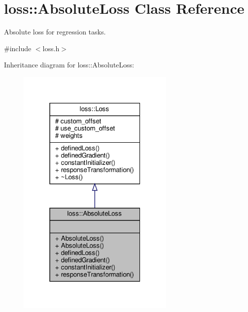 \hypertarget{classloss_1_1_absolute_loss}{}\section{loss\+:\+:Absolute\+Loss Class Reference}
\label{classloss_1_1_absolute_loss}


Absolute loss for regression tasks.  




{\ttfamily \#include $<$loss.\+h$>$}



Inheritance diagram for loss\+:\+:Absolute\+Loss\+:
\nopagebreak
\begin{figure}[H]
\begin{center}
\leavevmode
\includegraphics[width=217pt]{classloss_1_1_absolute_loss__inherit__graph}
\end{center}
\end{figure}


